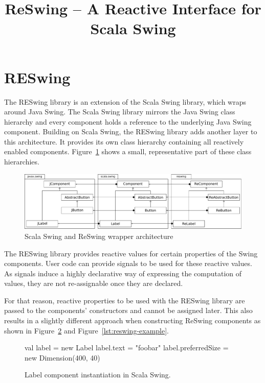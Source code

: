 \documentclass{scrartcl}
\title{ReSwing -- A Reactive Interface for Scala Swing}
\author{}
\date{}
\begin{document}
\maketitle






\section{RESwing}

The RESwing library is an extension of the Scala Swing library, which
wraps around Java Swing. The Scala Swing library mirrors the Java
Swing class hierarchy and every component holds a reference to the
underlying Java Swing component. Building on Scala Swing, the RESwing
library adds another layer to this architecture. It provides its own
class hierarchy containing all reactively enabled
components. Figure~\ref{fig:overview} shows a small, representative
part of these class hierarchies.

\begin{figure}[htp]
  \centering
  \includegraphics[width=\textwidth]{images/overview}
  \caption{Scala Swing and ReSwing wrapper architecture}
  \label{fig:overview}
\end{figure}

The RESwing library provides reactive values for certain  properties
of the Swing components. User code can provide signals to be used for
these reactive values. As signals induce a highly declarative way of
expressing the computation of values, they are not re-assignable once
they are declared.

For that reason, reactive properties to be used with the RESwing
library are passed to the components' constructors and cannot be
assigned later. This also results in a slightly different approach
when constructing ReSwing components as shown in
Figure~\ref{lst:scala-swing-example} and
Figure~\ref{lst:reswing-example}.


\begin{figure}[htp]
\begin{codenv}
val label = new Label
label.text = "foobar"
label.preferredSize = new Dimension(400, 40)
\end{codenv}
\caption{Label component instantiation in Scala Swing.}
\label{lst:scala-swing-example}
\end{figure}
\end{document}
